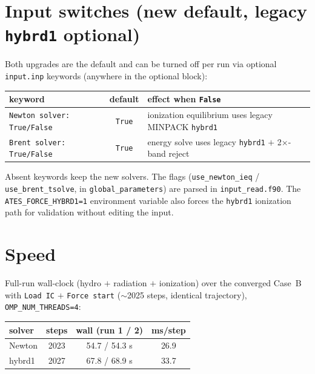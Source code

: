 \documentclass[english,a4paper]{kiseon_memo}
\begin{document}
\section{Input switches (new default, legacy \texttt{hybrd1} optional)}\label{sec:switch}
Both upgrades are the default and can be turned off per run via optional
\texttt{input.inp} keywords (anywhere in the optional block):

\begin{center}\small
\begin{tabular}{@{}lcl@{}}
\toprule
keyword & default & effect when \texttt{False} \\
\midrule
\texttt{Newton solver: True/False} & \texttt{True} & ionization equilibrium uses legacy MINPACK \texttt{hybrd1} \\
\texttt{Brent solver: True/False}  & \texttt{True} & energy solve uses legacy \texttt{hybrd1} $+$ 2$\times$-band reject \\
\bottomrule
\end{tabular}
\end{center}

\noindent Absent keywords keep the new solvers. The flags
(\texttt{use\_newton\_ieq} / \texttt{use\_brent\_tsolve}, in
\texttt{global\_parameters}) are parsed in \texttt{input\_read.f90}. The
\texttt{ATES\_FORCE\_HYBRD1=1} environment variable also forces the \texttt{hybrd1}
ionization path for validation without editing the input.

\section{Speed}\label{sec:speed}
Full-run wall-clock (hydro $+$ radiation $+$ ionization) over the converged Case~B
with \texttt{Load IC} $+$ \texttt{Force start} ($\sim$2025 steps, identical
trajectory), \texttt{OMP\_NUM\_THREADS=4}:

\begin{center}\small
\begin{tabular}{@{}lccc@{}}
\toprule
solver & steps & wall (run 1 / 2) & ms/step \\
\midrule
Newton & 2023 & 54.7 / 54.3 s & 26.9 \\
hybrd1 & 2027 & 67.8 / 68.9 s & 33.7 \\
\bottomrule
\end{tabular}
\end{center}
\end{document}

